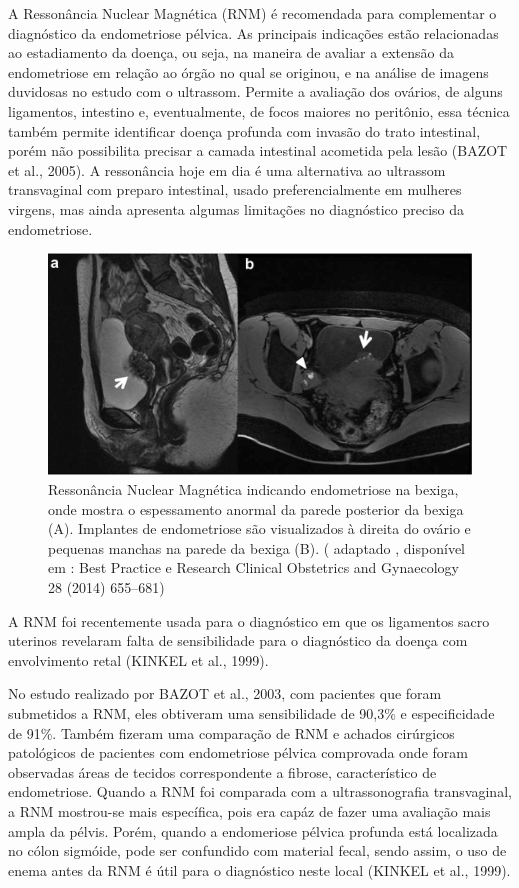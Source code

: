 \documentclass[12pt]{article} %
\begin{document}
A Ressonância Nuclear Magnética (RNM) é recomendada para complementar o diagnóstico da endometriose pélvica. As principais indicações estão relacionadas ao estadiamento da doença, ou seja, na maneira de avaliar a extensão da endometriose em relação ao órgão no qual se originou, e na análise de imagens duvidosas no estudo com o ultrassom. Permite a avaliação dos ovários, de alguns ligamentos, intestino e, eventualmente, de focos maiores no peritônio, essa técnica também permite identificar
doença profunda com invasão do trato intestinal, porém
não possibilita precisar a camada intestinal acometida pela
lesão (BAZOT et al., 2005). A ressonância hoje em dia é uma alternativa ao ultrassom transvaginal com preparo intestinal, usado preferencialmente em mulheres virgens, mas ainda apresenta algumas limitações no diagnóstico preciso da endometriose.
\newpage


\begin{figure}[h!]
\centering
\includegraphics[width=16cm]{RNM2.png}
\caption[RNM indicando endometriose na bexiga e no ovário]{Ressonância Nuclear Magnética indicando endometriose na bexiga, onde mostra o espessamento anormal da parede posterior da bexiga (A).  Implantes de endometriose são visualizados à direita do ovário e pequenas manchas na parede da bexiga (B). ( adaptado , disponível em : Best Practice e Research Clinical Obstetrics and Gynaecology 28 (2014) 655–681) }
\end{figure}


A RNM foi recentemente usada para o diagnóstico em que os ligamentos
sacro uterinos revelaram falta de sensibilidade para o diagnóstico da
doença com envolvimento retal (KINKEL et al., 1999).

No estudo realizado por BAZOT et al., 2003, com pacientes que foram
submetidos a RNM, eles obtiveram uma sensibilidade de 90,3\% e
especificidade de 91\%. Também fizeram uma comparação de RNM e
achados cirúrgicos patológicos de pacientes com endometriose pélvica
comprovada onde foram observadas áreas de tecidos correspondente a
fibrose, característico de endometriose. Quando a RNM foi comparada
com a ultrassonografia transvaginal, a RNM mostrou-se mais específica,
pois era capáz de fazer uma avaliação mais ampla da pélvis. Porém,
quando a endomeriose pélvica profunda está localizada no cólon
sigmóide, pode ser confundido com material fecal, sendo assim, o uso
de enema antes da RNM é útil para o diagnóstico neste local (KINKEL et al., 1999).
\end{document}
